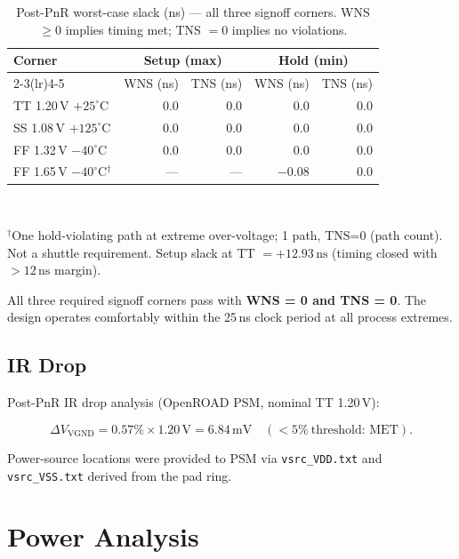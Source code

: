 \documentclass[11pt]{article}
\begin{document}
\begin{table}[H]
  \centering
  \caption{Post-PnR worst-case slack (ns) --- all three signoff corners.
           WNS $\geq 0$ implies timing met; TNS $= 0$ implies no violations.}
  \label{tab:timing}
  \small
  \begin{tabular}{lrrrr}
    \toprule
    Corner & \multicolumn{2}{c}{Setup (max)} & \multicolumn{2}{c}{Hold (min)} \\
    \cmidrule(lr){2-3}\cmidrule(lr){4-5}
    & WNS (ns) & TNS (ns) & WNS (ns) & TNS (ns) \\
    \midrule
    TT 1.20\,V $+25^\circ$C   & $0.0$ & $0.0$ & $0.0$ & $0.0$ \\
    SS 1.08\,V $+125^\circ$C  & $0.0$ & $0.0$ & $0.0$ & $0.0$ \\
    FF 1.32\,V $-40^\circ$C   & $0.0$ & $0.0$ & $0.0$ & $0.0$ \\
    \midrule
    FF 1.65\,V $-40^\circ$C$^\dagger$ & ---  & ---  & $-0.08$ & $0.0$ \\
    \bottomrule
  \end{tabular}
  \\[4pt]
  \raggedright\small
  $^\dagger$One hold-violating path at extreme over-voltage; 1 path, TNS=0 (path count).
  Not a shuttle requirement. Setup slack at TT $= +12.93\,\mathrm{ns}$ (timing closed
  with $>12\,\mathrm{ns}$ margin).
\end{table}

\noindent All three required signoff corners pass with \textbf{WNS = 0 and TNS = 0}.
The design operates comfortably within the 25\,ns clock period at all process extremes.

\subsection{IR Drop}

Post-PnR IR drop analysis (OpenROAD PSM, nominal TT 1.20\,V):

\begin{equation}
  \Delta V_{\text{VGND}} = 0.57\% \times 1.20\,\mathrm{V} = 6.84\,\mathrm{mV}
  \quad (<5\%\ \text{threshold: MET}).
  \label{eq:irdrop}
\end{equation}

Power-source locations were provided to PSM via \texttt{vsrc\_VDD.txt} and
\texttt{vsrc\_VSS.txt} derived from the pad ring.

\section{Power Analysis}
\end{document}

